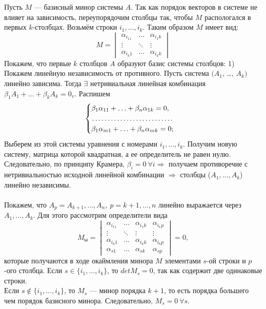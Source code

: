 \begin{Proof} Пусть $M$ --- базисный минор системы $A$. Так как порядок векторов в системе не влияет на зависимость, переупорядочим столбцы так, чтобы $M$ распологался в первых $k$-столбцах. Возьмём строки $i_1,\dots,i_k$. Таким образом $M$ имеет вид:\\
	$$M=\begin{vmatrix}
		\alpha_{i_11} & \dots & \alpha_{i_1k}
		\\ \vdots & \ddots & \vdots
		\\ \alpha_{i_k1} & \dots & \alpha_{i_kk}
	\end{vmatrix}$$ Покажем, что первые $k$ столбцов $A$ образуют базис системы столбцов: 1) Покажем линейную независимость от противного. Пусть система $(A_{1}$, \dots, $A_{k})$ линейно зависима. Тогда $\exists$  нетривиальная линейная комбинация $\beta_1 A_1 + \ldots + \beta_k A_k = 0_v$. Распишем
	$$\begin{cases}
		\beta_{1}\alpha_{11} + \ldots + \beta_{n}\alpha_{1k} = 0,
		\\ \dotfill
		\\ \beta_{1}\alpha_{m1} + \ldots + \beta_{n}\alpha_{mk} = 0;
	\end{cases}$$
	Выберем из этой системы уравнения с номерами $i_1,\dots,i_k$. Получим новую систему, матрица которой квадратная, а ее определитель не равен нулю. Следовательно, по принципу Крамера, $\beta_i = 0\ \forall i \Rightarrow$ получаем противоречие с нетривиальностью исходной линейной комбинации $\Rightarrow$ столбцы ($A_1,\dots,A_k$) линейно независимы.\\\\
	Покажем, что $A_p = A_{k+1},\dots,A_n,\ p = k+1,\dots, n$ линейно выражается через $A_1,\dots,A_k$. Для этого рассмотрим определители вида
	$$M_{ы} = \begin{vmatrix} \alpha_{i_11} & \dots & \alpha_{i_1k} & \alpha_{i_1p}
		\\ \vdots & \ddots & \vdots & \vdots \\ \alpha_{i_k1} & \dots & \alpha_{i_kk} & \alpha_{i_kp}
		\\ \alpha_{s1} & \dots & \alpha_{sk} & \alpha_{sp}
	\end{vmatrix} = 0,$$ которые получаются в ходе окаймления минора $M$ элементами $s$-ой строки и $p$-ого столбца. Если $s\in \{i_1,\dots,i_k\}$, то $detM_s = 0$, так как содержит две одинаковые строки.\\
	Если $s\not\in \{i_1,\dots,i_k\}$, то $M_s$ --- минор порядка $k+1$, то есть порядка большего чем порядок базисного минора. Следовательно, $M_s = 0\ \forall s$.\\

\end{Proof}

